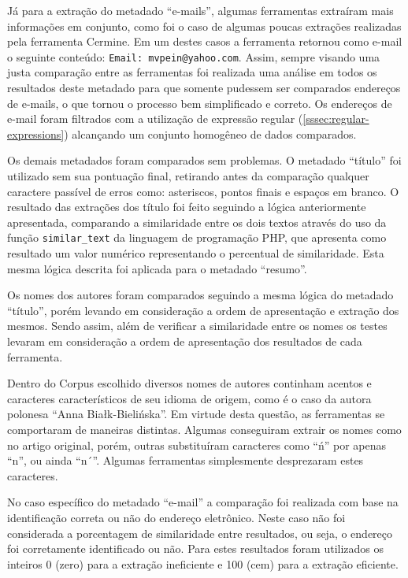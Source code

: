 Já para a extração do metadado ``e-mails'', algumas ferramentas extraíram mais informações em conjunto, como foi o caso de algumas poucas extrações realizadas pela ferramenta Cermine. Em um destes casos a ferramenta retornou como e-mail o seguinte conteúdo: \texttt{Email: mvpein@yahoo.com}. Assim, sempre visando uma justa comparação entre as ferramentas foi realizada uma análise em todos os resultados deste metadado para que somente pudessem ser comparados endereços de e-mails, o que tornou o processo bem simplificado e correto. Os endereços de e-mail foram filtrados com a utilização de expressão regular (\autoref{sssec:regular-expressions}) alcançando um conjunto homogêneo de dados comparados.

Os demais metadados foram comparados sem problemas. O metadado ``título'' foi utilizado sem sua pontuação final, retirando antes da comparação qualquer caractere passível de erros como: asteriscos, pontos finais e espaços em branco. O resultado das extrações dos título foi feito seguindo a lógica anteriormente apresentada, comparando a similaridade entre os dois textos através do uso da função \texttt{similar\_text} da linguagem de programação PHP, que apresenta como resultado um valor numérico representando o percentual de similaridade. Esta mesma lógica descrita foi aplicada para o metadado ``resumo''.

Os nomes dos autores foram comparados seguindo a mesma lógica do metadado ``título'', porém levando em consideração a ordem de apresentação e extração dos mesmos. Sendo assim, além de verificar a similaridade entre os nomes os testes levaram em consideração a ordem de apresentação dos resultados de cada ferramenta.


Dentro do Corpus escolhido diversos nomes de autores continham acentos e caracteres característicos de seu idioma de origem, como é o caso da autora polonesa ``Anna Białk-Bielińska''. Em virtude desta questão, as ferramentas se comportaram de maneiras distintas. Algumas conseguiram extrair os nomes como no artigo original, porém, outras substituíram caracteres como ``ń'' por apenas ``n'', ou ainda ``n´''. Algumas ferramentas simplesmente desprezaram estes caracteres.

No caso específico do metadado ``e-mail'' a comparação foi realizada com base na identificação correta ou não do endereço eletrônico. Neste caso não foi considerada a porcentagem de similaridade entre resultados, ou seja, o endereço foi corretamente identificado ou não. Para estes resultados foram utilizados os inteiros 0 (zero) para a extração ineficiente e 100 (cem) para a extração eficiente.

